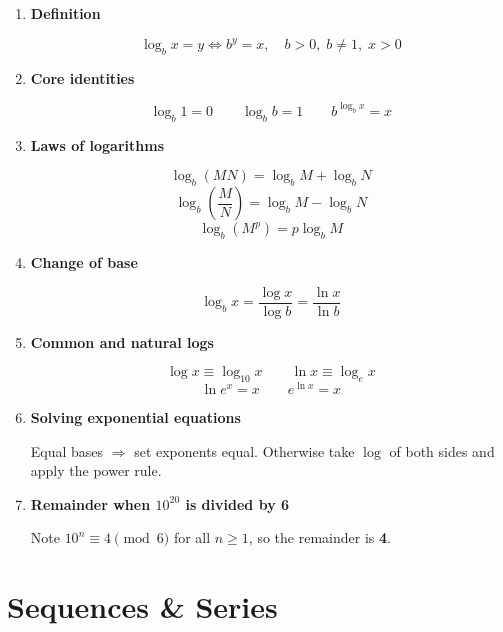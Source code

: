 \documentclass[10pt,letterpaper]{article}
\begin{document}
\begin{enumerate}

\item \textbf{Definition}

$$\log_b x = y \iff b^y = x, \quad b > 0,\; b \ne 1,\; x > 0$$

\item \textbf{Core identities}

$$\log_b 1 = 0 \qquad \log_b b = 1 \qquad b^{\log_b x} = x$$

\item \textbf{Laws of logarithms}

$$\log_b(MN) = \log_b M + \log_b N$$
$$\log_b\!\left(\frac{M}{N}\right) = \log_b M - \log_b N$$
$$\log_b(M^p) = p\log_b M$$

\item \textbf{Change of base}

$$\log_b x = \frac{\log x}{\log b} = \frac{\ln x}{\ln b}$$

\item \textbf{Common and natural logs}

$$\log x \equiv \log_{10} x \qquad \ln x \equiv \log_e x$$
$$\ln e^x = x \qquad e^{\ln x} = x$$

\item \textbf{Solving exponential equations}

Equal bases $\Rightarrow$ set exponents equal. Otherwise take $\log$ of both sides and apply the power rule.

\item \textbf{Remainder when $10^{20}$ is divided by 6}

Note $10^n \equiv 4 \pmod{6}$ for all $n \ge 1$, so the remainder is \textbf{4}.

\end{enumerate}

\section{Sequences \& Series}
\end{document}
